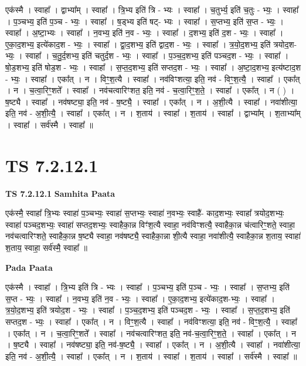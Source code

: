 \documentclass[17pt]{extarticle}
\begin{document}
एक॑स्मै । स्वाहा᳚ । द्वाभ्या᳚म् । स्वाहा᳚ । त्रि॒भ्य इति॑ त्रि - भ्यः । स्वाहा᳚ । च॒तुर्भ्य॒ इति॑ च॒तुः - भ्यः॒ । स्वाहा᳚ । प॒ञ्चभ्य॒ इति॑ प॒ञ्च - भ्यः॒ । स्वाहा᳚ । ष॒ड्भ्य इति॑ षट्- भ्यः । स्वाहा᳚ । स॒प्तभ्य॒ इति॑ स॒प्त - भ्यः॒ । स्वाहा᳚ । अ॒ष्टा॒भ्यः । स्वाहा᳚ । न॒वभ्य॒ इति॑ न॒व - भ्यः॒ । स्वाहा᳚ । द॒शभ्य॒ इति॑ द॒श - भ्यः॒ । स्वाहा᳚ । ए॒का॒द॒शभ्य॒ इत्ये॑काद॒श - भ्यः॒ । स्वाहा᳚ । द्वा॒द॒शभ्य॒ इति॑ द्वाद॒श - भ्यः॒ । स्वाहा᳚ । त्र॒यो॒द॒शभ्य॒ इति॑ त्रयोद॒श-भ्यः॒ । स्वाहा᳚ । च॒तु॒र्द॒शभ्य॒ इति॑ चतुर्द॒श - भ्यः॒ । स्वाहा᳚ । प॒ञ्च॒द॒शभ्य॒ इति॑ पञ्चद॒श - भ्यः॒ । स्वाहा᳚ । षो॒ड॒शभ्य॒ इति॑ षोड॒श - भ्यः॒ । स्वाहा᳚ । स॒प्त॒द॒शभ्य॒ इति॑ सप्तद॒श - भ्यः॒ । स्वाहा᳚ । अ॒ष्टा॒द॒शभ्य॒ इत्य॑ष्टाद॒श - भ्यः॒ । स्वाहा᳚ । एका᳚त् । न । विꣳ॒॒श॒त्यै । स्वाहा᳚ । नव॑विꣳशत्या॒ इति॒ नव॑ - विꣳ॒॒श॒त्यै॒ । स्वाहा᳚ । एका᳚त् । न । च॒त्वा॒रिꣳ॒॒शते᳚ । स्वाहा᳚ । नव॑चत्वारिꣳशत॒ इति॒ नव॑ - च॒त्वा॒रिꣳ॒॒श॒ते॒ । स्वाहा᳚ । एका᳚त् । न ( ) । ष॒ष्ट्यै । स्वाहा᳚ । नव॑षष्ट्या॒ इति॒ नव॑ - ष॒ष्ट्यै॒ । स्वाहा᳚ । एका᳚त् । न । अ॒शी॒त्यै । स्वाहा᳚ । नवा॑शीत्या॒ इति॒ नव॑ - अ॒शी॒त्यै॒ । स्वाहा᳚ । एका᳚त् । न । श॒ताय॑ । स्वाहा᳚ । श॒ताय॑ । स्वाहा᳚ । द्वाभ्या᳚म् । श॒ताभ्या᳚म् । स्वाहा᳚ । सर्व॑स्मै । स्वाहा᳚ ॥  \newline





\section{ TS 7.2.12.1 }

\textbf{TS 7.2.12.1 } \newline
\textbf{Samhita Paata} \newline

एक॑स्मै॒ स्वाहा᳚ त्रि॒भ्यः स्वाहा॑ प॒ञ्चभ्यः॒ स्वाहा॑ स॒प्तभ्यः॒ स्वाहा॑ न॒वभ्यः॒ स्वाहै॑- काद॒शभ्यः॒ स्वाहा᳚ त्रयोद॒शभ्यः॒ स्वाहा॑ पञ्चद॒शभ्यः॒ स्वाहा॑ सप्तद॒शभ्यः॒ स्वाहैका॒न्न विꣳ॑श॒त्यै स्वाहा॒ नव॑विꣳशत्यै॒ स्वाहैका॒न्न च॑त्वारिꣳ॒॒शते॒ स्वाहा॒ नव॑चत्वारिꣳशते॒ स्वाहैका॒न्न ष॒ष्ट्यै स्वाहा॒ नव॑षष्ट्यै॒ स्वाहैका॒न्ना शी॒त्यै स्वाहा॒ नवा॑शीत्यै॒ स्वाहैका॒न्न श॒ताय॒ स्वाहा॑ श॒ताय॒ स्वाहा॒ सर्व॑स्मै॒ स्वाहा᳚ ॥ \newline

\textbf{Pada Paata} \newline

एक॑स्मै । स्वाहा᳚ । त्रि॒भ्य इति॑ त्रि - भ्यः । स्वाहा᳚ । प॒ञ्चभ्य॒ इति॑ प॒ञ्च - भ्यः॒ । स्वाहा᳚ । स॒प्तभ्य॒ इति॑ स॒प्त - भ्यः॒ । स्वाहा᳚ । न॒वभ्य॒ इति॑ न॒व - भ्यः॒ । स्वाहा᳚ । ए॒का॒द॒शभ्य॒ इत्ये॑काद॒श-भ्यः॒ । स्वाहा᳚ । त्र॒यो॒द॒शभ्य॒ इति॑ त्रयोद॒श - भ्यः॒ । स्वाहा᳚ । प॒ञ्च॒द॒शभ्य॒ इति॑ पञ्चद॒श - भ्यः॒ । स्वाहा᳚ । स॒प्त॒द॒शभ्य॒ इति॑ सप्तद॒श - भ्यः॒ । स्वाहा᳚ । एका᳚त् । न । विꣳ॒॒श॒त्यै । स्वाहा᳚ । नव॑विꣳशत्या॒ इति॒ नव॑ - विꣳ॒॒श॒त्यै॒ । स्वाहा᳚ । एका᳚त् । न । च॒त्वा॒रिꣳ॒॒शते᳚ । स्वाहा᳚ । नव॑चत्वारिꣳशत॒ इति॒ नव॑-च॒त्वा॒रिꣳ॒॒श॒ते॒ । स्वाहा᳚ । एका᳚त् । न । ष॒ष्ट्यै । स्वाहा᳚ । नव॑षष्ट्या॒ इति॒ नव॑-ष॒ष्ट्यै॒ । स्वाहा᳚ । एका᳚त् । न । अ॒शी॒त्यै । स्वाहा᳚ । नवा॑शीत्या॒ इति॒ नव॑ - अ॒शी॒त्यै॒ । स्वाहा᳚ । एका᳚त् । न । श॒ताय॑ । स्वाहा᳚ । श॒ताय॑ । स्वाहा᳚ । सर्व॑स्मै । स्वाहा᳚ ॥  \newline
\end{document}
